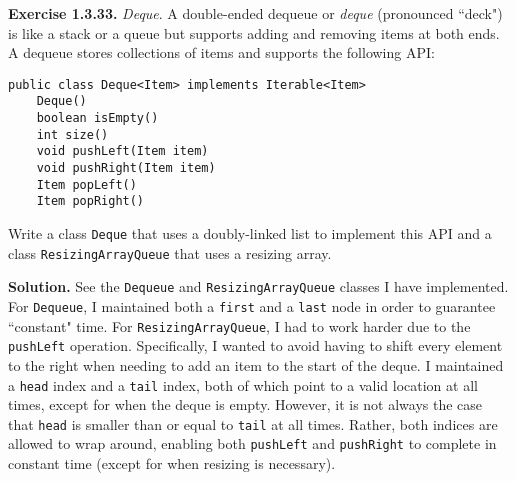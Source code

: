 \documentclass[12pt, a4paper]{article}
\newenvironment{ex}[2][Exercise]
{\par\medskip\noindent \textbf{#1 #2.}}
{\medskip}
\newenvironment{sol}[1][Solution]
{\par\medskip\noindent \textbf{#1.} }
{\medskip}
\begin{document}
	\begin{ex}{1.3.33}
		\emph{Deque}. A double-ended dequeue or \emph{deque} (pronounced ``deck") is
		like a stack or a queue but supports adding and removing items at both ends.
		A dequeue stores collections of items and supports the following API:
		\begin{lstlisting}[language={}]
public class Deque<Item> implements Iterable<Item>
	Deque()
	boolean isEmpty()
	int size()
	void pushLeft(Item item)
	void pushRight(Item item)
	Item popLeft()
	Item popRight()
		\end{lstlisting}
		Write a class \texttt{Deque} that uses a doubly-linked list to implement this API
		and a class \texttt{ResizingArrayQueue} that uses a resizing array.
	\end{ex}
	\begin{sol}
		See the \texttt{Dequeue} and \texttt{ResizingArrayQueue} classes I have implemented.
		For \texttt{Dequeue}, I maintained both a \texttt{first} and a \texttt{last} node
		in order to guarantee ``constant" time. For \texttt{ResizingArrayQueue}, I had
		to work harder due to the \texttt{pushLeft} operation. Specifically, I wanted to
		avoid having to shift every element to the right when needing to add an item to
		the start of the deque. I maintained a \texttt{head} index and a \texttt{tail}
		index, both of which point to a valid location at all times, except for when
		the deque is empty. However, it is not always the case that \texttt{head} is
		smaller than or equal to \texttt{tail} at all times. Rather, both indices
		are allowed to wrap around, enabling both \texttt{pushLeft} and \texttt{pushRight}
		to complete in constant time (except for when resizing is necessary).
	\end{sol}
	\pagebreak
	\printbibliography
\end{document}
